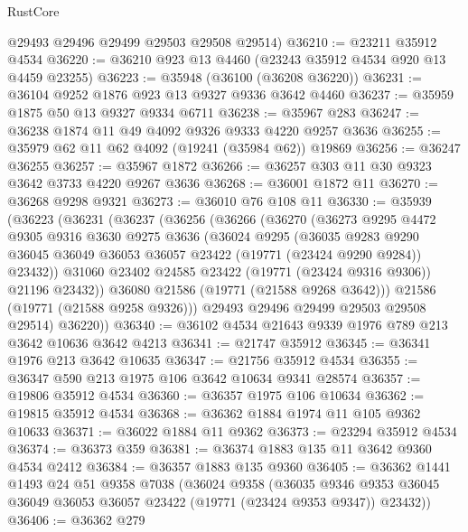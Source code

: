 \begin{lexlean}{RustCore}
\begin{coremodule}
      @29493
      @29496
      @29499
      @29503
      @29508
      @29514)
@36210 := @23211 @35912 @4534
@36220 := @36210 @923 @13 @4460 (@23243 @35912 @4534 @920 @13 @4459 @23255)
@36223 := @35948 (@36100 (@36208 @36220))
@36231 := @36104 @9252 @1876 @923 @13 @9327 @9336 @3642 @4460
@36237 := @35959 @1875 @50 @13 @9327 @9334 @6711
@36238 := @35967 @283
@36247 := @36238 @1874 @11 @49 @4092 @9326 @9333 @4220 @9257 @3636
@36255 := @35979 @62 @11 @62 @4092 (@19241 (@35984 @62)) @19869
@36256 := @36247 @36255
@36257 := @35967 @1872
@36266 := @36257 @303 @11 @30 @9323 @3642 @3733 @4220 @9267 @3636
@36268 := @36001 @1872 @11
@36270 := @36268 @9298 @9321
@36273 := @36010 @76 @108 @11
@36330 := @35939
    (@36223
      (@36231
        (@36237
          (@36256
            (@36266
              (@36270
                (@36273
                  @9295
                  @4472
                  @9305
                  @9316
                  @3630
                  @9275
                  @3636
                  (@36024
                    @9295
                    (@36035
                      @9283
                      @9290
                      @36045
                      @36049
                      @36053
                      @36057
                      @23422
                      (@19771 (@23424 @9290 @9284))
                      @23432))
                  @31060
                  @23402
                  @24585
                  @23422
                  (@19771 (@23424 @9316 @9306))
                  @21196
                  @23432))
              @36080
              @21586
              (@19771 (@21588 @9268 @3642)))
            @21586
            (@19771 (@21588 @9258 @9326)))
          @29493
          @29496
          @29499
          @29503
          @29508
          @29514)
        @36220))
@36340 := @36102 @4534 @21643 @9339 @1976 @789 @213 @3642 @10636 @3642 @4213
@36341 := @21747 @35912
@36345 := @36341 @1976 @213 @3642 @10635
@36347 := @21756 @35912 @4534
@36355 := @36347 @590 @213 @1975 @106 @3642 @10634 @9341 @28574
@36357 := @19806 @35912 @4534
@36360 := @36357 @1975 @106 @10634
@36362 := @19815 @35912 @4534
@36368 := @36362 @1884 @1974 @11 @105 @9362 @10633
@36371 := @36022 @1884 @11 @9362
@36373 := @23294 @35912 @4534
@36374 := @36373 @359
@36381 := @36374 @1883 @135 @11 @3642 @9360 @4534 @2412
@36384 := @36357 @1883 @135 @9360
@36405 := @36362
    @1441
    @1493
    @24
    @51
    @9358
    @7038
    (@36024
      @9358
      (@36035 @9346 @9353 @36045 @36049 @36053 @36057 @23422 (@19771 (@23424 @9353 @9347)) @23432))
@36406 := @36362 @279

\end{coremodule}
\end{lexlean}
